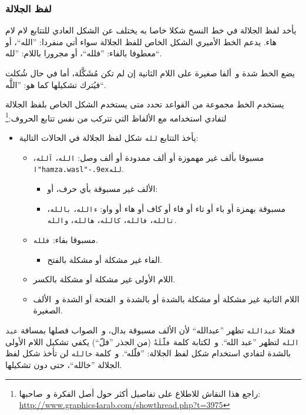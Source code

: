 \documentclass[a4paper]{article}
\begin{document}
\subsubsection{لفظ الجلالة}
يأخد لفظ الجلالة في خط النسخ شكلا خاصا به يختلف عن الشكل العادي للتتابع
لام لام هاء. يدعم الخط الأميري الشكل الخاص للفظ الجلالة سواء أتي منفردا:
”الله“، أو معطوفا بالفاء: ”فلله“، أو مجرورا باللام: ”لله“.

يضع الخط شدة و ألفا صغيرة على اللام الثانية إن لم تكن مُشَكَّلة، أما في
حال شُكلت فيُترك تشكيلها كما هو: ”اللَّه“.

يستخدم الخط مجموعة من القواعد تحدد متى يستخدم الشكل الخاص بلفظ الجلالة
لتفادي استخدامه مع الألفاظ التي تتركب من نفس تتابع الحروف:\footnote{راجع
هذا النقاش للاطلاع على تفاصيل أكثر حول أصل الفكرة و صاحبها:
\url{http://www.graphics4arab.com/showthread.php?t=3975}}

\def\ٱ{ا\textrm{\XeTeXglyph\XeTeXglyphindex "hamza.wasl"}\kern-.9ex}

\begin{itemize}
\item
  يأخذ التتابع \texttt{لله} شكل لفظ الجلالة في الحالات التالية:
  \begin{itemize}
  \item
    مسبوقا بألف غير مهموزة أو ألف ممدودة أو ألف وصل: \texttt{الله}،
    \texttt{آلله}، \texttt{\ٱ{}لله}.
    \begin{itemize}
    \item
      الألف غير مسبوقة بأي حرف، أو:
    \item
      مسبوقة بهمزة أو باء أو تاء أو فاء أو كاف أو هاء أو واو:
      \texttt{ءالله}، \texttt{بالله}، \texttt{تالله}، \texttt{فالله}،
      \texttt{كالله}، \texttt{هالله}، \texttt{والله}.
    \end{itemize}
  \item
    مسبوقا بفاء: \texttt{فلله}.
    \begin{itemize}
    \item
      الفاء غير مشكلة أو مشكلة بالفتح.
    \end{itemize}
  \item
    اللام الأولى غير مشكلة أو مشكلة بالكسر.
  \item
    اللام الثانية غير مشكلة أو مشكلة بالشدة أو بالشدة و الفتحة أو الشدة
    و الألف الصغيرة.
  \end{itemize}
\end{itemize}

فمثلا \texttt{عبدالله} تظهر ”عبدالله“ لأن الألف مسبوقة بدال، و الصواب
فصلها بمسافة \texttt{عبد الله} لتظهر ”عبد الله“. و لكتابة كلمة
\texttt{فلَّلَهُ} (من الجذر ”فلّ“) يكفي تشكيل اللام الأولى بالشدة
لتفادي استخدام شكل لفظ الجلالة: ”فلّله“. و كلمة \texttt{خالله} لن تأخذ
شكل لفظ الجلالة ”خالله“، حتى دون تشكيلها.
\end{document}
